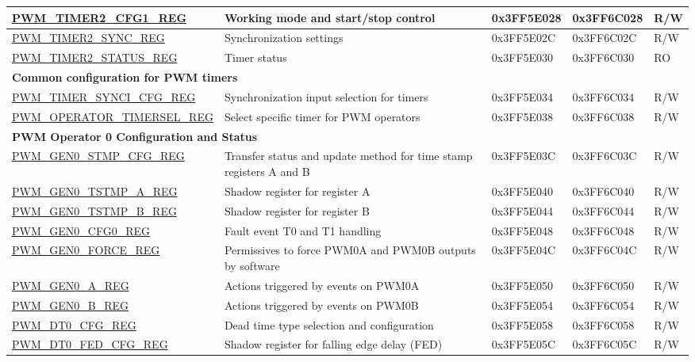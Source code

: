 \begin{longtable}{ | p{5.5cm} | p{5.7cm} | p{2cm} | p{2cm} | p{0.8cm} | }
\hyperref[regdesc:PWMTIMER2CFG1REG]{PWM\_TIMER2\_CFG1\_REG} & Working mode and start/stop control & 0x3FF5E028 & 0x3FF6C028 & R/W \\ \hline
\hyperref[regdesc:PWMTIMER2SYNCREG]{PWM\_TIMER2\_SYNC\_REG} & Synchronization settings & 0x3FF5E02C & 0x3FF6C02C & R/W \\ \hline
\hyperref[regdesc:PWMTIMER2STATUSREG]{PWM\_TIMER2\_STATUS\_REG} & Timer status & 0x3FF5E030 & 0x3FF6C030 & RO \\ \hline
\multicolumn{5}{|l|}{\textbf{Common configuration for PWM timers}} \\ \hline
\hyperref[regdesc:PWMTIMERSYNCICFGREG]{PWM\_TIMER\_SYNCI\_CFG\_REG} & Synchronization input selection for timers & 0x3FF5E034 & 0x3FF6C034 & R/W \\ \hline
\hyperref[regdesc:PWMOPERATORTIMERSELREG]{PWM\_OPERATOR\_TIMERSEL\_REG} & Select specific timer for PWM operators & 0x3FF5E038 & 0x3FF6C038 & R/W \\ \hline
\multicolumn{5}{|l|}{\textbf{PWM Operator 0 Configuration and Status}} \\ \hline
\hyperref[regdesc:PWMGEN0STMPCFGREG]{PWM\_GEN0\_STMP\_CFG\_REG} & Transfer status and update method for time stamp registers A and B & 0x3FF5E03C & 0x3FF6C03C & R/W \\ \hline
\hyperref[regdesc:PWMGEN0TSTMPAREG]{PWM\_GEN0\_TSTMP\_A\_REG} & Shadow register for register A & 0x3FF5E040 & 0x3FF6C040 & R/W \\ \hline
\hyperref[regdesc:PWMGEN0TSTMPBREG]{PWM\_GEN0\_TSTMP\_B\_REG} & Shadow register for register B & 0x3FF5E044 & 0x3FF6C044 & R/W \\ \hline
\hyperref[regdesc:PWMGEN0CFG0REG]{PWM\_GEN0\_CFG0\_REG} & Fault event T0 and T1 handling & 0x3FF5E048 & 0x3FF6C048 & R/W \\ \hline
\hyperref[regdesc:PWMGEN0FORCEREG]{PWM\_GEN0\_FORCE\_REG} & Permissives to force PWM0A and PWM0B outputs by software & 0x3FF5E04C & 0x3FF6C04C & R/W \\ \hline
\hyperref[regdesc:PWMGEN0AREG]{PWM\_GEN0\_A\_REG} & Actions triggered by events on PWM0A & 0x3FF5E050 & 0x3FF6C050 & R/W \\ \hline
\hyperref[regdesc:PWMGEN0BREG]{PWM\_GEN0\_B\_REG} & Actions triggered by events on PWM0B & 0x3FF5E054 & 0x3FF6C054 & R/W \\ \hline
\hyperref[regdesc:PWMDT0CFGREG]{PWM\_DT0\_CFG\_REG} & Dead time type selection and configuration & 0x3FF5E058 & 0x3FF6C058 & R/W \\ \hline
\hyperref[regdesc:PWMDT0FEDCFGREG]{PWM\_DT0\_FED\_CFG\_REG} & Shadow register for falling edge delay (FED) & 0x3FF5E05C & 0x3FF6C05C & R/W \\ \hline

\end{longtable}
